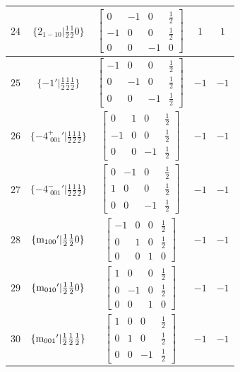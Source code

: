 \documentclass[fleqn,8pt]{jsarticle}
\begin{document}
\begin{longtable}{ccccc}
$ 24 $ & $ \{2{}_{1-10}|\frac{1}{2} \frac{1}{2} 0\} $ & $ \begin{bmatrix} 0 & -1 & 0 & \frac{1}{2} \\ -1 & 0 & 0 & \frac{1}{2} \\ 0 & 0 & -1 & 0 \end{bmatrix} $ & $ 1 $ & $ 1 $ \\ \hline
$ 25 $ & $ \{-1{}'|\frac{1}{2} \frac{1}{2} \frac{1}{2}\} $ & $ \begin{bmatrix} -1 & 0 & 0 & \frac{1}{2} \\ 0 & -1 & 0 & \frac{1}{2} \\ 0 & 0 & -1 & \frac{1}{2} \end{bmatrix} $ & $ -1 $ & $ -1 $ \\ \hline
$ 26 $ & $ \{-4^{+}_{\,\,001}{}'|\frac{1}{2} \frac{1}{2} \frac{1}{2}\} $ & $ \begin{bmatrix} 0 & 1 & 0 & \frac{1}{2} \\ -1 & 0 & 0 & \frac{1}{2} \\ 0 & 0 & -1 & \frac{1}{2} \end{bmatrix} $ & $ -1 $ & $ -1 $ \\ \hline
$ 27 $ & $ \{-4^{-}_{\,\,001}{}'|\frac{1}{2} \frac{1}{2} \frac{1}{2}\} $ & $ \begin{bmatrix} 0 & -1 & 0 & \frac{1}{2} \\ 1 & 0 & 0 & \frac{1}{2} \\ 0 & 0 & -1 & \frac{1}{2} \end{bmatrix} $ & $ -1 $ & $ -1 $ \\ \hline
$ 28 $ & $ \{{\rm m}_{100}{}'|\frac{1}{2} \frac{1}{2} 0\} $ & $ \begin{bmatrix} -1 & 0 & 0 & \frac{1}{2} \\ 0 & 1 & 0 & \frac{1}{2} \\ 0 & 0 & 1 & 0 \end{bmatrix} $ & $ -1 $ & $ -1 $ \\ \hline
$ 29 $ & $ \{{\rm m}_{010}{}'|\frac{1}{2} \frac{1}{2} 0\} $ & $ \begin{bmatrix} 1 & 0 & 0 & \frac{1}{2} \\ 0 & -1 & 0 & \frac{1}{2} \\ 0 & 0 & 1 & 0 \end{bmatrix} $ & $ -1 $ & $ -1 $ \\ \hline
$ 30 $ & $ \{{\rm m}_{001}{}'|\frac{1}{2} \frac{1}{2} \frac{1}{2}\} $ & $ \begin{bmatrix} 1 & 0 & 0 & \frac{1}{2} \\ 0 & 1 & 0 & \frac{1}{2} \\ 0 & 0 & -1 & \frac{1}{2} \end{bmatrix} $ & $ -1 $ & $ -1 $ \\ \hline

\end{longtable}
\end{document}

